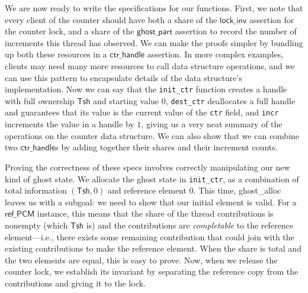 \documentclass[11pt]{article}
\begin{document}
We are now ready to write the specifications for our functions. First, we note that every client of the counter should have both a share of the $\mathsf{lock\_inv}$ assertion for the counter lock, and a share of the $\mathsf{ghost\_part}$ assertion to record the number of increments this thread has observed. We can make the proofs simpler by bundling up both these resources in a $\mathsf{ctr\_handle}$ assertion. In more complex examples, clients may need many more resources to call data structure operations, and we can use this pattern to encapsulate details of the data structure's implementation. Now we can say that the \texttt{init\_ctr} function creates a handle with full ownership $\mathsf{Tsh}$ and starting value $0$, \texttt{dest\_ctr} deallocates a full handle and guarantees that its value is the current value of the \texttt{ctr} field, and \texttt{incr} increments the value in a handle by $1$, giving us a very neat summary of the operations on the counter data structure. We can also show that we can combine two $\mathsf{ctr\_handle}$s by adding together their shares and their increment counts.


Proving the correctness of these specs involves correctly manipulating our new kind of ghost state. We allocate the ghost state in \texttt{init\_ctr}, as a combination of total information $(\mathsf{Tsh}, 0)$ and reference element $0$. This time, \textsf{ghost\_alloc} leaves us with a subgoal: we need to show that our initial element is valid. For a $\mathsf{ref\_PCM}$ instance, this means that the share of the thread contributions is nonempty (which $\mathsf{Tsh}$ is) and the contributions are \emph{completable} to the reference element---i.e., there exists some remaining contribution that could join with the existing contributions to make the reference element. When the share is total and the two elements are equal, this is easy to prove. Now, when we release the counter lock, we establish its invariant by separating the reference copy from the contributions and giving it to the lock.
\end{document}
